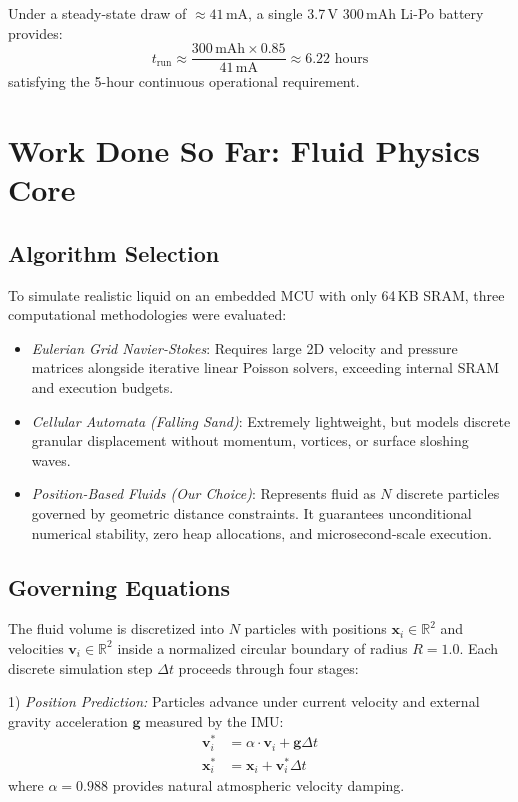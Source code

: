 \documentclass[conference]{IEEEtran}
\begin{document}
Under a steady-state draw of $\approx 41$\,mA, a single 3.7\,V 300\,mAh Li-Po battery provides:
\begin{equation}
    t_{\text{run}} \approx \frac{300\,\text{mAh} \times 0.85}{41\,\text{mA}} \approx 6.22 \text{ hours}
\end{equation}
satisfying the 5-hour continuous operational requirement.

\section{Work Done So Far: Fluid Physics Core}

\subsection{Algorithm Selection}
To simulate realistic liquid on an embedded MCU with only 64\,KB SRAM, three computational methodologies were evaluated:
\begin{itemize}
    \item \emph{Eulerian Grid Navier-Stokes}: Requires large 2D velocity and pressure matrices alongside iterative linear Poisson solvers, exceeding internal SRAM and execution budgets.
    \item \emph{Cellular Automata (Falling Sand)}: Extremely lightweight, but models discrete granular displacement without momentum, vortices, or surface sloshing waves.
    \item \emph{Position-Based Fluids (Our Choice)}: Represents fluid as $N$ discrete particles governed by geometric distance constraints. It guarantees unconditional numerical stability, zero heap allocations, and microsecond-scale execution.
\end{itemize}

\subsection{Governing Equations}
The fluid volume is discretized into $N$ particles with positions $\mathbf{x}_i \in \mathbb{R}^2$ and velocities $\mathbf{v}_i \in \mathbb{R}^2$ inside a normalized circular boundary of radius $R = 1.0$. Each discrete simulation step $\Delta t$ proceeds through four stages:

1) \emph{Position Prediction:} Particles advance under current velocity and external gravity acceleration $\mathbf{g}$ measured by the IMU:
\begin{align}
    \mathbf{v}_i^* &= \alpha \cdot \mathbf{v}_i + \mathbf{g} \Delta t \\
    \mathbf{x}_i^* &= \mathbf{x}_i + \mathbf{v}_i^* \Delta t
\end{align}
where $\alpha = 0.988$ provides natural atmospheric velocity damping.
\end{document}
